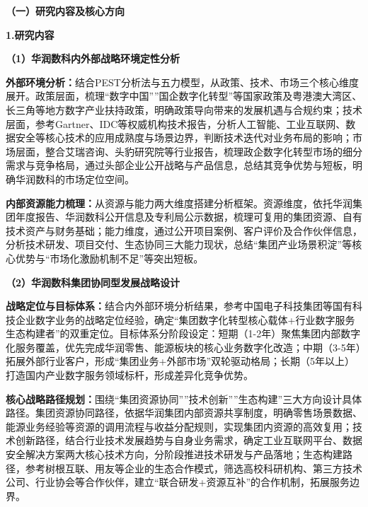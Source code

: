 \documentclass[UTF8, a4paper, 11pt]{ctexart}
\begin{document}
\vspace{0.6cm}

\newpage

\begin{UnifiedBox}
\setlength{\parindent}{2em}

\noindent \textbf{（一）研究内容及核心方向}

\vspace{0.2cm}
\noindent \textbf{1.研究内容}

\vspace{0.2cm}
\noindent \textbf{（1）华润数科内外部战略环境定性分析}

\noindent \textbf{外部环境分析：}结合PEST分析法与五力模型，从政策、技术、市场三个核心维度展开。政策层面，梳理``数字中国''''国企数字化转型''等国家政策及粤港澳大湾区、长三角等地方数字产业扶持政策，明确政策导向带来的发展机遇与合规约束；技术层面，参考Gartner、IDC等权威机构技术报告，分析人工智能、工业互联网、数据安全等核心技术的应用成熟度与场景边界，判断技术迭代对业务布局的影响；市场层面，整合艾瑞咨询、头豹研究院等行业报告，梳理政企数字化转型市场的细分需求与竞争格局，通过头部企业公开战略与产品信息，总结其竞争优势与短板，明确华润数科的市场定位空间。

\noindent \textbf{内部资源能力梳理：}从资源与能力两大维度搭建分析框架。资源维度，依托华润集团年度报告、华润数科公开信息及专利局公示数据，梳理可复用的集团资源、自有技术资产与财务基础；能力维度，通过公开项目案例、客户评价及合作伙伴信息，分析技术研发、项目交付、生态协同三大能力现状，总结``集团产业场景积淀''等核心优势与``市场化激励机制不足''等突出短板。

\vspace{0.3cm}
\noindent \textbf{（2）华润数科集团协同型发展战略设计}

\vspace{0.2cm}
\noindent \textbf{战略定位与目标体系：}结合内外部环境分析结果，参考中国电子科技集团等国有科技企业数字业务的战略定位经验，确定``集团数字化转型核心载体+行业数字服务生态构建者''的双重定位。目标体系分阶段设定：短期（1-2年）聚焦集团内部数字化服务覆盖，优先完成华润零售、能源板块的核心业务数字化改造；中期（3-5年）拓展外部行业客户，形成``集团业务+外部市场''双轮驱动格局；长期（5年以上）打造国内产业数字服务领域标杆，形成差异化竞争优势。

\noindent \textbf{核心战略路径规划：}围绕``集团资源协同''''技术创新''''生态构建''三大方向设计具体路径。集团资源协同路径，依据华润集团内部资源共享制度，明确零售场景数据、能源业务经验等资源的调用流程与收益分配规则，实现集团内资源的高效复用；技术创新路径，结合行业技术发展趋势与自身业务需求，确定工业互联网平台、数据安全解决方案两大核心技术方向，分阶段推进技术研发与产品落地；生态构建路径，参考树根互联、用友等企业的生态合作模式，筛选高校科研机构、第三方技术公司、行业协会等合作伙伴，建立``联合研发+资源互补''的合作机制，拓展服务边界。


\end{UnifiedBox}
\end{document}
